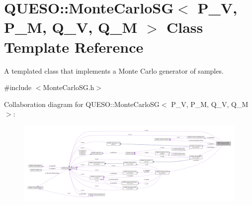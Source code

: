 \hypertarget{class_q_u_e_s_o_1_1_monte_carlo_s_g}{\section{Q\-U\-E\-S\-O\-:\-:Monte\-Carlo\-S\-G$<$ P\-\_\-\-V, P\-\_\-\-M, Q\-\_\-\-V, Q\-\_\-\-M $>$ Class Template Reference}
\label{class_q_u_e_s_o_1_1_monte_carlo_s_g}
}


A templated class that implements a Monte Carlo generator of samples.  




{\ttfamily \#include $<$Monte\-Carlo\-S\-G.\-h$>$}



Collaboration diagram for Q\-U\-E\-S\-O\-:\-:Monte\-Carlo\-S\-G$<$ P\-\_\-\-V, P\-\_\-\-M, Q\-\_\-\-V, Q\-\_\-\-M $>$\-:
\nopagebreak
\begin{figure}[H]
\begin{center}
\leavevmode
\includegraphics[width=350pt]{class_q_u_e_s_o_1_1_monte_carlo_s_g__coll__graph}
\end{center}
\end{figure}
